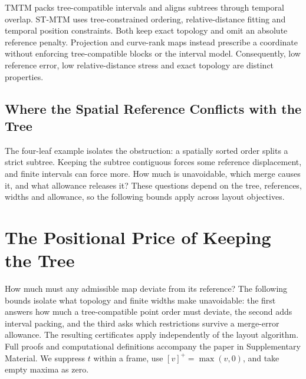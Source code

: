 \documentclass[review]{vgtc}
\begin{document}
TMTM packs tree-compatible intervals and aligns subtrees through temporal overlap. ST-MTM uses tree-constrained ordering, relative-distance fitting and temporal position constraints. Both keep exact topology and omit an absolute reference penalty. Projection and curve-rank maps instead prescribe a coordinate without enforcing tree-compatible blocks or the interval model. Consequently, low reference error, low relative-distance stress and exact topology are distinct properties.


\subsection{Where the Spatial Reference Conflicts with the Tree}\label{sec:conflict}

The four-leaf example isolates the obstruction: a spatially sorted order splits a strict subtree. Keeping the subtree contiguous forces some reference displacement, and finite intervals can force more. How much is unavoidable, which merge causes it, and what allowance releases it? These questions depend on the tree, references, widths and allowance, so the following bounds apply across layout objectives.

\section{The Positional Price of Keeping the Tree}\label{sec:bounds}
How much must any admissible map deviate from its reference? The following bounds isolate what topology and finite widths make unavoidable: the first answers how much a tree-compatible point order must deviate, the second adds interval packing, and the third asks which restrictions survive a merge-error allowance. The resulting certificates apply independently of the layout algorithm. Full proofs and computational definitions accompany the paper in Supplementary Material. We suppress $t$ within a frame, use $[v]^+=\max(v,0)$, and take empty maxima as zero.
\end{document}
